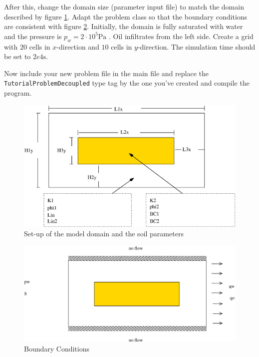 After this, change the domain size (parameter input file) to match the domain described
by figure \ref{tutorial-decoupled:ex2_Domain}. Adapt the problem class
so that the boundary conditions are consistent with figure
\ref{tutorial-decoupled:ex2_BC}. Initially, the domain is fully saturated
with water and the pressure is $p_w = 2 \cdot 10^5 \text{Pa}$ . Oil
infiltrates from the left side. Create a grid with $20$ cells in
$x$-direction and $10$ cells in $y$-direction. The simulation time
should be set to $2e4 \text{s}$.

Now include your new problem file in the main file and replace the
\texttt{TutorialProblemDecoupled} type tag by the one you've created and
compile the program.


\begin{figure}[ht]
\centering
\includegraphics[width=0.8\linewidth,keepaspectratio]{EPS/Ex2_Domain.eps}
\caption{Set-up of the model domain and the soil parameters}\label{tutorial-decoupled:ex2_Domain}
\end{figure}

\begin{figure}[ht]
\centering
\includegraphics[width=0.8\linewidth,keepaspectratio]{EPS/Ex2_Boundary.eps}
\caption{Boundary Conditions}\label{tutorial-decoupled:ex2_BC}
\end{figure}

